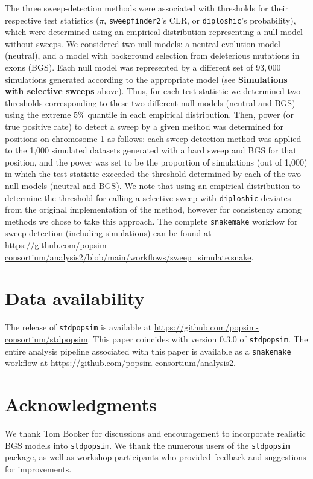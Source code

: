 \documentclass[hidelinks]{article}
\newcommand{\stdpopsim}{\texttt{stdpopsim}\xspace}
\newcommand{\snakemake}{\texttt{snakemake}\xspace}
\newcommand{\sweepfinder}{\texttt{sweepfinder2}\xspace}
\newcommand{\diploshic}{\texttt{diploshic}\xspace}
\begin{document}
    The three sweep-detection methods were associated with thresholds for their respective test statistics
    ($\pi$, \sweepfinder's CLR, or \diploshic's probability),
    which were determined using an empirical distribution representing a null model without sweeps.
    We considered two null models: a neutral evolution model (neutral),
    and a model with background selection from deleterious mutations in exons (BGS).
    Each null model was represented by a different set of $93,000$ simulations generated according to the appropriate model
    (see \textbf{Simulations with selective sweeps} above).
    Thus, for each test statistic we determined two thresholds corresponding to these two different null models (neutral and BGS)
    using the extreme $5\%$ quantile in each empirical distribution.
    Then, power (or true positive rate) to detect a sweep by a given method was determined for
    positions on chromosome 1 as follows:
    each sweep-detection method was applied to the 1,000
    simulated datasets generated with a hard sweep and BGS for that position,
    and the power was set to be the proportion of simulations (out of 1,000)
    in which the test statistic exceeded the threshold determined by each of the two null models (neutral and BGS).
    We note that using an empirical distribution to determine the threshold for calling a selective
    sweep with \diploshic deviates from the original implementation of the method,
    however for consistency among methods we chose to take this approach.
    The complete \snakemake workflow for sweep detection (including simulations) can be found at
    \url{https://github.com/popsim-consortium/analysis2/blob/main/workflows/sweep_simulate.snake}.

\section*{Data availability}\label{data_availability}
The release of \stdpopsim is available at \url{https://github.com/popsim-consortium/stdpopsim}.
This paper coincides with version 0.3.0 of \stdpopsim.
The entire analysis pipeline associated with this paper is available
as a \snakemake workflow at \url{https://github.com/popsim-consortium/analysis2}.

\section*{Acknowledgments}\label{acknowledgements}
We thank Tom Booker for discussions and encouragement to incorporate realistic BGS models into \stdpopsim.
We thank the numerous users of the \stdpopsim package, as well as
workshop participants who provided feedback and suggestions for improvements.
\end{document}
